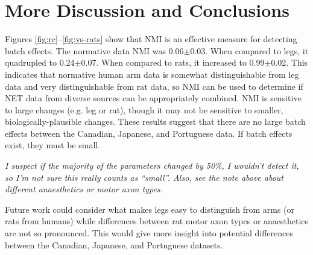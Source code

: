 \documentclass[12pt]{article}
\begin{document}
\pagebreak

\section*{More Discussion and Conclusions}

Figures \ref{fig:rc}–\ref{fig:vs-rats} show that NMI is an effective measure for detecting batch effects. The normative data NMI was 0.06$\pm$0.03. When compared to legs, it quadrupled to 0.24$\pm$0.07. When compared to rats, it increased to 0.99$\pm$0.02. This indicates that normative human arm data is somewhat distinguishable from leg data and very distinguishable from rat data, so NMI can be used to determine if NET data from diverse sources can be appropriately combined. NMI is sensitive to large changes (e.g. leg or rat), though it may not be sensitive to smaller, biologically-plausible changes. These results suggest that there are no large batch effects between the Canadian, Japanese, and Portuguese data. If batch effects exist, they must be small.

\emph{I suspect if the majority of the parameters changed by 50\%, I wouldn't detect it, so I'm not sure this really counts as ``small''. Also, see the note above about different anaesthetics or motor axon types.}

Future work could consider what makes legs easy to distinguish from arms (or rats from humans) while differences between rat motor axon types or anaesthetics are not so pronounced. This would give more insight into potential differences between the Canadian, Japanese, and Portuguese datasets.

\end{document}
